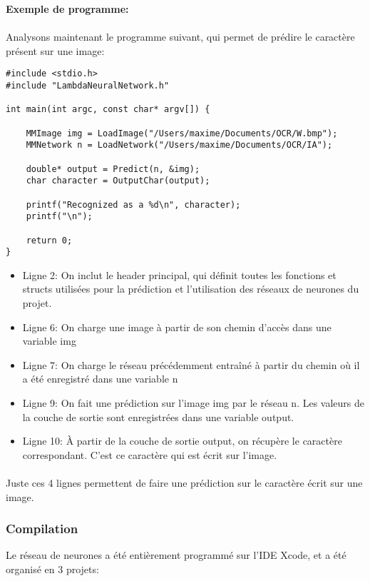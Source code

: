 \documentclass{article}
\begin{document}
\textbf{Exemple de programme:}

\paragraph{}Analysons maintenant le programme suivant, qui permet de prédire le caractère présent sur une image:


\begin{lstlisting}
#include <stdio.h>
#include "LambdaNeuralNetwork.h"

int main(int argc, const char* argv[]) {

	MMImage img = LoadImage("/Users/maxime/Documents/OCR/W.bmp");
	MMNetwork n = LoadNetwork("/Users/maxime/Documents/OCR/IA");
	
	double* output = Predict(n, &img);
	char character = OutputChar(output);
	
	printf("Recognized as a %d\n", character);
	printf("\n");
	
	return 0;
}
\end{lstlisting}


\begin{itemize}
	\item Ligne 2: On inclut le header principal, qui définit toutes les fonctions et structs utilisées pour la prédiction et l'utilisation des réseaux de neurones du projet.
	\item Ligne 6: On charge une image à partir de son chemin d'accès dans une variable img
	\item Ligne 7: On charge le réseau précédemment entraîné à partir du chemin où il a été enregistré dans une variable n
	\item Ligne 9: On fait une prédiction sur l'image img par le réseau n. Les valeurs de la couche de sortie sont enregistrées dans une variable output.
	\item Ligne 10: À partir de la couche de sortie output, on récupère le caractère correspondant. C'est ce caractère qui est écrit sur l'image.
\end{itemize}

\paragraph{}Juste ces 4 lignes permettent de faire une prédiction sur le caractère écrit sur une image.

\newpage

\subsubsection{Compilation}
Le réseau de neurones a été entièrement programmé sur l'IDE Xcode, et a été organisé en 3 projets:
\end{document}
